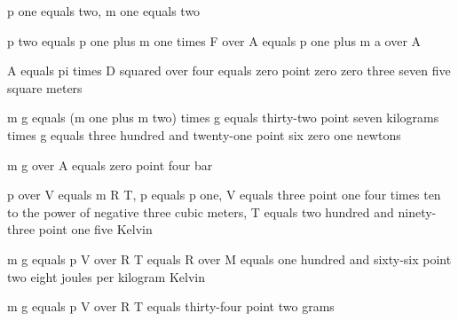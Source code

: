 p one equals two, m one equals two

p two equals p one plus m one times F over A equals p one plus m a over A

A equals pi times D squared over four equals zero point zero zero three seven five square meters

m g equals (m one plus m two) times g equals thirty-two point seven kilograms times g equals three hundred and twenty-one point six zero one newtons

m g over A equals zero point four bar

p over V equals m R T, p equals p one, V equals three point one four times ten to the power of negative three cubic meters, T equals two hundred and ninety-three point one five Kelvin

m g equals p V over R T equals R over M equals one hundred and sixty-six point two eight joules per kilogram Kelvin

m g equals p V over R T equals thirty-four point two grams